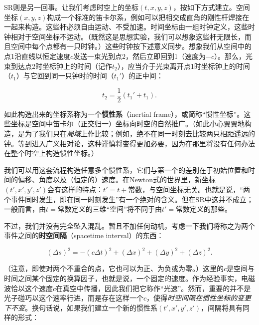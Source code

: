 SR则是另一回事。让我们考虑时空上的坐标$(t,x,y,z)$，按如下方式建立。空间坐标$(x,y,z)$构成一个标准的笛卡尔系，例如可以把相交成直角的刚性杆焊接在一起来构造。这些杆必须自由运动、不受加速。时间坐标由一组时钟定义，这些时钟相对于空间坐标不运动。（既然这是思想实验，我们可以想象这些杆无限长，而且空间中每个点都有一只时钟。）这些时钟按下述意义同步。想象我们从空间中的点1沿直线以恒定速度$c$发送一束光到点2，然后立即回到1（速度为$-c$）。那么，光束到达点2时坐标钟上的时间（记作$t_2$），应当介于光束离开点1时坐标钟上的时间（$t_1$）与它回到同一只钟时的时间（$t_1'$）的正中间：

\begin{equation*}
t_2 = \frac{1}{2}(t_1' + t_1).
\tag{1.9}
\end{equation*}

如此构造出来的坐标系称为一个\textbf{惯性系}（inertial frame），或简称“惯性坐标”。这些坐标是空间中笛卡尔（正交归一）坐标向时空的自然推广。（如此小心翼翼地构造，是为了我们只在\emph{局域}上作比较；例如，绝不在同一时刻去比较两只相距遥远的钟。等到进入广义相对论，这种谨慎将变得更加必要，因为在那里将没有任何办法在整个时空上构造惯性坐标。）


我们可以用这套流程构造任意多个惯性系，它们与第一个的差别在于初始位置和时间的偏移、角度以及（恒定的）速度。在Newton式的世界里，新坐标$(t',x',y',z')$会有这样的特点：$t'=t+\text{常数}$，与空间坐标无关。也就是说，“两个事件同时发生，即在同一时刻发生”有一个绝对的含义。但在SR中这并不成立；一般而言，由$t=\text{常数}$定义的三维“空间”将不同于由$t'=\text{常数}$定义的那些。

不过，我们并没有完全坠入混乱。暂且不加任何动机，考虑一下我们将称之为两个事件之间的\textbf{时空间隔}（spacetime interval）的东西：

\begin{equation*}
\boxed{(\Delta s)^2 = -(c\Delta t)^2 + (\Delta x)^2 + (\Delta y)^2 + (\Delta z)^2.}
\tag{1.10}
\end{equation*}

（注意，即使对两个不重合的点，它也可以为正、为负或为零。）这里的$c$是空间与时间之间某个固定的换算因子，也就是说，一个固定的速度。作为经验事实，电磁波恰以这个速度$c$在真空中传播，因此我们把它称作“光速”。然而，重要的并不是光子碰巧以这个速率行进，而是存在这样一个$c$，使得\emph{时空间隔在惯性坐标的变更下不变}。换句话说，如果我们建立一个新的惯性系$(t',x',y',z')$，间隔将具有同样的形式：

